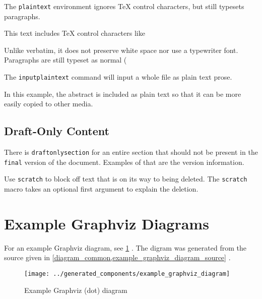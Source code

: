 The \lstinline{plaintext} environment ignores TeX control characters,
but still typesets paragraphs.

\begin{plaintext}
    This text includes TeX control characters like %

    Unlike verbatim, it does not preserve white space nor use a typewriter font.
    Paragraphs are still
    typeset as normal (%
\end{plaintext}

The \lstinline{inputplaintext} command will input a whole file as plain text prose.

In this example, the abstract is included as plain text so that it can be more easily copied to other media.



\subsection{Draft-Only Content}

There is \lstinline{draftonlysection} for an entire section that should not be present in the \lstinline{final} version of the document.
Examples of that are the version information.

Use \lstinline{scratch} to block off text that is on its way to being deleted.
The \lstinline{scratch} macro takes an optional first argument to explain the deletion.




\section{Example Graphviz Diagrams}

For an example Graphviz diagram, see
\cref{example_graphviz_diagram}%
.
The digram was generated from the source given in
\cref{diagram_common,example_graphviz_diagram_source}%
.

\begin{figure}[h]
    \centering
    \texttt{[image: ../generated\_components/example\_graphviz\_diagram]}
    \caption{Example Graphviz (dot) diagram}
    \label{example_graphviz_diagram}
\end{figure}

